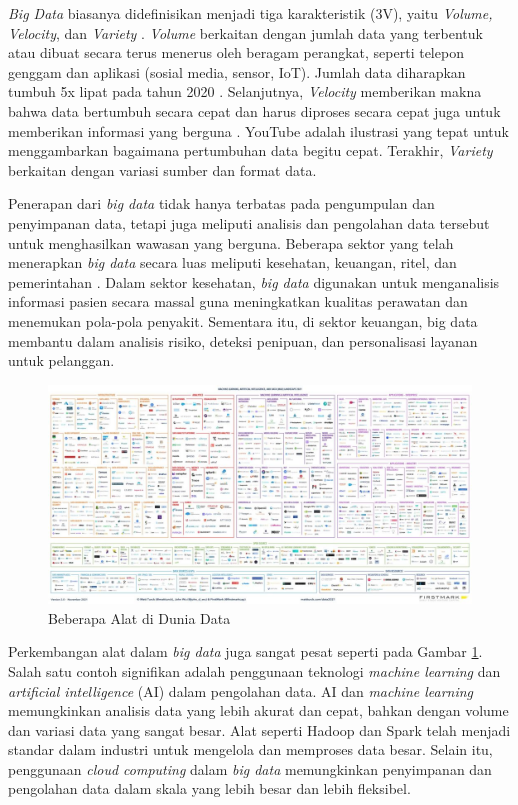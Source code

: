 \textit{Big Data} biasanya didefinisikan menjadi tiga karakteristik (3V), yaitu \textit{Volume, Velocity}, dan \textit{Variety} \cite{furhtIntroductionBigData2016}. \textit{Volume} berkaitan dengan jumlah data yang terbentuk atau dibuat secara terus menerus oleh beragam  perangkat, seperti telepon genggam dan aplikasi (sosial media, sensor, IoT). Jumlah data diharapkan tumbuh 5x lipat pada tahun 2020 \cite{furhtIntroductionBigData2016}. Selanjutnya, \textit{Velocity} memberikan makna bahwa data bertumbuh secara cepat dan harus diproses secara cepat juga untuk memberikan informasi yang berguna \cite{sandhuBigDataCloud2022}. YouTube adalah ilustrasi yang tepat untuk menggambarkan bagaimana pertumbuhan data begitu cepat. Terakhir, \textit{Variety} berkaitan dengan variasi sumber dan format data. 

Penerapan dari \textit{big data} tidak hanya terbatas pada pengumpulan dan penyimpanan data, tetapi juga meliputi analisis dan pengolahan data tersebut untuk menghasilkan wawasan yang berguna. Beberapa sektor yang telah menerapkan \textit{big data} secara luas meliputi kesehatan, keuangan, ritel, dan pemerintahan \cite{oussousBigDataTechnologies2018}. Dalam sektor kesehatan, \textit{big data} digunakan untuk menganalisis informasi pasien secara massal guna meningkatkan kualitas perawatan dan menemukan pola-pola penyakit. Sementara itu, di sektor keuangan, big data membantu dalam analisis risiko, deteksi penipuan, dan personalisasi layanan untuk pelanggan.

\begin{figure}[h!]
    \centering
    \includegraphics[width=1\textwidth]{figures/ch02/data-stack.jpg}
    \caption{Beberapa Alat di Dunia Data \cite{RedHot20212021}}
    \label{fig:data-stacks}
\end{figure}

Perkembangan alat dalam \textit{big data} juga sangat pesat seperti pada Gambar \ref{fig:data-stacks}. Salah satu contoh signifikan adalah penggunaan teknologi \textit{machine learning} dan \textit{artificial intelligence} (AI) dalam pengolahan data. AI dan \textit{machine learning} memungkinkan analisis data yang lebih akurat dan cepat, bahkan dengan volume dan variasi data yang sangat besar. Alat seperti Hadoop dan Spark telah menjadi standar dalam industri untuk mengelola dan memproses data besar. Selain itu, penggunaan \textit{cloud computing} dalam \textit{big data} memungkinkan penyimpanan dan pengolahan data dalam skala yang lebih besar dan lebih fleksibel.

